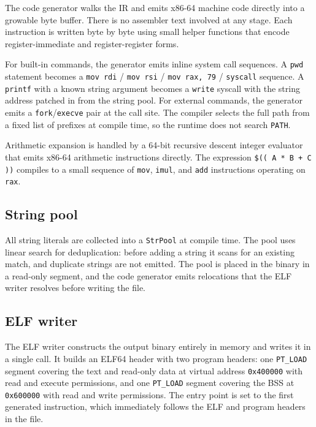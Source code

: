 \documentclass[10pt,twocolumn]{article}
\begin{document}
The code generator walks the IR and emits x86-64 machine code
directly into a growable byte buffer. There is no assembler text
involved at any stage. Each instruction is written byte by byte using
small helper functions that encode register-immediate and
register-register forms.

For built-in commands, the generator emits inline system call
sequences. A \texttt{pwd} statement becomes a
\texttt{mov~rdi} / \texttt{mov~rsi} / \texttt{mov~rax,~79} /
\texttt{syscall} sequence. A \texttt{printf} with a known string
argument becomes a \texttt{write} syscall with the string address
patched in from the string pool. For external commands, the generator
emits a \texttt{fork}/\texttt{execve} pair at the call site. The
compiler selects the full path from a fixed list of prefixes at
compile time, so the runtime does not search \texttt{PATH}.

Arithmetic expansion is handled by a 64-bit recursive descent integer
evaluator that emits x86-64 arithmetic instructions directly. The
expression \texttt{\$(( A * B + C ))} compiles to a small sequence of
\texttt{mov}, \texttt{imul}, and \texttt{add} instructions operating
on \texttt{rax}.

\subsection{String pool}

All string literals are collected into a \texttt{StrPool} at compile
time. The pool uses linear search for deduplication: before adding a
string it scans for an existing match, and duplicate strings are not
emitted. The pool is placed in the binary in a read-only segment, and
the code generator emits relocations that the ELF writer resolves
before writing the file.

\subsection{ELF writer}

The ELF writer constructs the output binary entirely in memory and
writes it in a single call. It builds an ELF64 header with two program
headers: one \texttt{PT\_LOAD} segment covering the text and
read-only data at virtual address \texttt{0x400000} with read and
execute permissions, and one \texttt{PT\_LOAD} segment covering the
BSS at \texttt{0x600000} with read and write permissions. The entry
point is set to the first generated instruction, which immediately
follows the ELF and program headers in the file.
\end{document}
